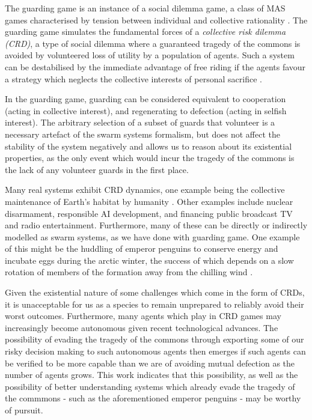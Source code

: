 The guarding game is an instance of a social dilemma game, a class of
MAS games characterised by tension between individual
and collective rationality \cite{VanlangeJPV13}. The guarding game simulates
the fundamental forces of a \emph{collective risk dilemma (CRD)}, a type of
social dilemma where a guaranteed tragedy of the commons
\cite{Hardin68} is avoided by volunteered loss of utility by a population of
agents. Such a system can be destabilised by the immediate advantage of
free riding if the agents favour a strategy which neglects the
collective interests of personal sacrifice \cite{SantosP11}.

In the guarding game, guarding can be considered equivalent to cooperation
(acting in collective interest), and regenerating to defection (acting in
selfish interest). The arbitrary selection of a subset of guards that volunteer
is a necessary artefact of the swarm systems formalism, but does not affect the
stability of the system negatively and allows us to reason about its
existential properties, as the only event which would incur the tragedy of the
commons is the lack of any volunteer guards in the first place.

Many real systems exhibit CRD dynamics, one example being the collective
maintenance of Earth's habitat by humanity \cite{Smirnov19}. Other examples
include nuclear disarmament, responsible AI development, and financing public
broadcast TV and radio entertainment. Furthermore, many of these can be
directly or indirectly modelled as swarm systems, as we have done with guarding
game. One example of this might be the huddling of emperor penguins to conserve
energy and incubate eggs \cite{GilbertRLNA06} during the
arctic winter, the success of which depends on a slow rotation of members of
the formation away from the chilling wind \cite{WatersBK12}.

Given the existential nature of some challenges which come in the form of CRDs,
it is unacceptable for us as a species to remain unprepared to reliably avoid
their worst outcomes. Furthermore, many agents which play in CRD games may
increasingly become autonomous given recent technological advances. The
possibility of evading the tragedy of the commons through exporting some of our
risky decision making to such autonomous agents then emerges if such agents can
be verified to be more capable than we are of avoiding mutual defection as the
number of agents grows. This work indicates that this possibility, as well as
the possibility of better understanding systems which already evade the tragedy
of the commmons - such as the aforementioned emperor penguins - may be worthy
of pursuit.

